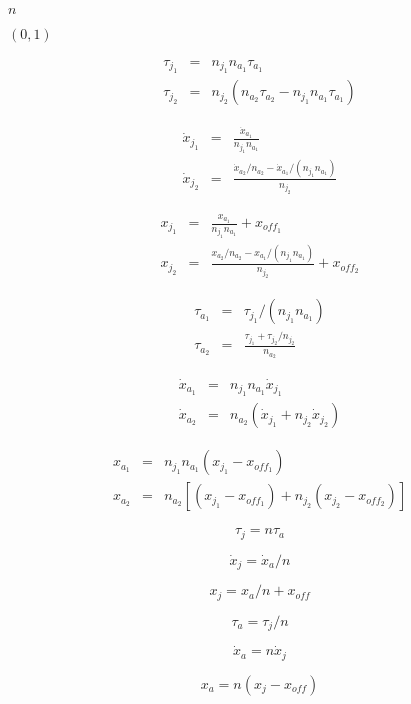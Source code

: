 \documentclass{article}
\begin{document}
$ n $
\pagebreak

$ (0, 1) $
\pagebreak

\begin{eqnarray*} \tau_{j_1} & = & n_{j_1} n_{a_1} \tau_{a_1} \\ \tau_{j_2} & = & n_{j_2} (n_{a_2} \tau_{a_2} - n_{j_1} n_{a_1} \tau_{a_1}) \end{eqnarray*}
\pagebreak

\begin{eqnarray*} \dot{x}_{j_1} & = & \frac{ \dot{x}_{a_1} }{ n_{j_1} n_{a_1} } \\ \dot{x}_{j_2} & = & \frac{ \dot{x}_{a_2} / n_{a_2} - \dot{x}_{a_1} / (n_{j_1} n_{a_1}) }{ n_{j_2} } \end{eqnarray*}
\pagebreak

\begin{eqnarray*} x_{j_1} & = & \frac{ x_{a_1} }{ n_{j_1} n_{a_1} } + x_{off_1} \\ x_{j_2} & = & \frac{ x_{a_2} / n_{a_2} - x_{a_1} / (n_{j_1} n_{a_1}) }{ n_{j_2} } + x_{off_2} \end{eqnarray*}
\pagebreak

\begin{eqnarray*} \tau_{a_1} & = & \tau_{j_1} / (n_{j_1} n_{a_1}) \\ \tau_{a_2} & = & \frac{ \tau_{j_1} + \tau_{j_2} / n_{j_2} }{ n_{a_2} } \end{eqnarray*}
\pagebreak

\begin{eqnarray*} \dot{x}_{a_1} & = & n_{j_1} n_{a_1} \dot{x}_{j_1} \\ \dot{x}_{a_2} & = & n_{a_2} (\dot{x}_{j_1} + n_{j_2} \dot{x}_{j_2}) \end{eqnarray*}
\pagebreak

\begin{eqnarray*} x_{a_1} & = & n_{j_1} n_{a_1} (x_{j_1} - x_{off_1}) \\ x_{a_2} & = & n_{a_2} \left[(x_{j_1} - x_{off_1}) + n_{j_2} (x_{j_2} - x_{off_2})\right] \end{eqnarray*}
\pagebreak

\[ \tau_j = n \tau_a \]
\pagebreak

\[ \dot{x}_j = \dot{x}_a / n \]
\pagebreak

\[ x_j = x_a / n + x_{off} \]
\pagebreak

\[ \tau_a = \tau_j / n\]
\pagebreak

\[ \dot{x}_a = n \dot{x}_j \]
\pagebreak

\[ x_a = n (x_j - x_{off}) \]
\pagebreak
\end{document}
